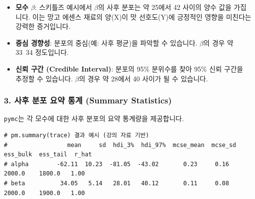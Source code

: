 \documentclass[11pt,a4paper]{article}
\theoremstyle{definition}
\begin{document}
\begin{infobox}[title=히스토그램 해석]
\begin{itemize}
    \item \textbf{모수 $\beta$}: 스키틀즈 예시에서 $\beta$의 사후 분포는 약 25에서 42 사이의 양수 값을 가집니다. 이는 망고 에센스 재료의 양(X)이 맛 선호도(Y)에 긍정적인 영향을 미친다는 강력한 증거입니다.
    \item \textbf{중심 경향성}: 분포의 중심(예: 사후 평균)을 파악할 수 있습니다. $\beta$의 경우 약 33~34 정도입니다.
    \item \textbf{신뢰 구간 (Credible Interval)}: 분포의 95\% 분위수를 찾아 95\% 신뢰 구간을 추정할 수 있습니다. $\beta$의 경우 약 28에서 40 사이가 될 수 있습니다.
\end{itemize}
\end{infobox}

\subsubsection*{3. 사후 분포 요약 통계 (Summary Statistics)}
\texttt{pymc}는 각 모수에 대한 사후 분포의 요약 통계량을 제공합니다.

\begin{lstlisting}[caption={\texttt{pymc} 사후 분포 요약 출력 예시}, label={lst:pymc_summary}]
# pm.summary(trace) 결과 예시 (강의 자료 기반)
#                 mean     sd  hdi_3%  hdi_97%  mcse_mean  mcse_sd  ess_bulk  ess_tail  r_hat
# alpha        -62.11  10.23  -81.05  -43.02       0.23     0.16    2000.0    1800.0   1.00
# beta          34.05   5.14   28.01   40.12       0.11     0.08    2000.0    1900.0   1.00
\end{lstlisting}

\begin{infobox}[title=주요 요약 통계량 설명]
\end{infobox}
\end{document}
